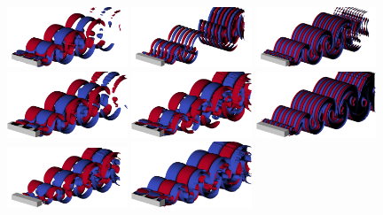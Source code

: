 \documentclass{jfm}
\begin{document}
\begin{figure}
  \includegraphics[width=0.32\textwidth]{./fig/AR1s/Floqetmode_beta_1p2_Re200_AR1_A.png}
  \includegraphics[width=0.32\textwidth]{./fig/AR1s/Floqetmode_beta_3p75_Re200_AR1_C.png}      
  \includegraphics[width=0.32\textwidth]{./fig/AR1s/Floqetmode_beta_5p5_Re200_AR1_B.png}
  \includegraphics[width=0.32\textwidth]{./fig/AR1s/Floqetmode_beta_1p25_Re200_AR1p25_A.png}
  \includegraphics[width=0.32\textwidth]{./fig/AR1s/Floqetmode_beta_1p25_Re200_AR1p25_Bp.png}
  \includegraphics[width=0.32\textwidth]{./fig/AR1s/Floqetmode_beta_5p5_Re200_AR1p25_B.png}
  \includegraphics[width=0.32\textwidth]{./fig/AR1s/Floqetmode_beta_1p8_Re200_AR1p5_A.png}
  \includegraphics[width=0.32\textwidth]{./fig/AR1s/Floqetmode_beta_1p8_Re200_AR1p5_Bp.png}

\end{figure}
\end{document}
